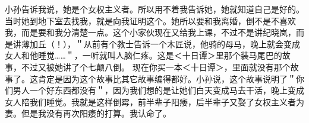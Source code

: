 小孙告诉我说，她是个女权主义者。所以用不着我告诉她，她就知道自己是好的。当时她到地下室去找我，就是向我证明这个。她所以要和我离婚，倒不是不喜欢我，而是要和我分清楚一点。这个小家伙现在又给我上课，不过不是讲纪晓岚，而是讲薄加丘（！），＂从前有个教士告诉一个木匠说，他骑的母马，晚上就会变成女人和他睡觉……＂，一听就叫人脑仁疼。这是＜十日谭＞里那个装马尾巴的故事，不过又被她讲了个七颠八倒。 现在你买一本＜十日谭＞，里面就没有那个故事了。这肯定是因为这个故事比其它故事编得都好。小孙说，这个故事说明了＂你们男人一个好东西都没有＂，因为我们想的是让她们白天变成马去干活，晚上变成女人陪我们睡觉。我就是这样倒霉，前半辈子阳痿，后半辈子又娶了女权主义者为妻。但是我没有再次阳痿的打算。我认命了。
